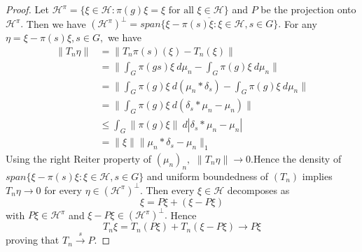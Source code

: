 \documentclass[11pt]{amsart}
\theoremstyle{definition}
\theoremstyle{myremark}
\numberwithin{equation}{section}
\begin{document}
 \begin{proof}
 Let $\mathcal{H}^\pi=\{\xi \in \mathcal{H}: \pi(g)\xi=\xi \text{ for all }\xi \in \mathcal{H}\}$ and $P$ be the projection onto $\mathcal{H}^\pi.$ Then we have $(\mathcal{H}^\pi)^{\perp}=\overline{span\{\xi-\pi(s)\xi: \xi \in \mathcal{H}, s\in G\}}.$
  For any $\eta=\xi-\pi(s)\xi, s\in G,$ we have 
  \begin{align*}
  \|T_n\eta\|
      &=\|T_n\pi(s)(\xi)-T_n(\xi)\|\\&= \|\int_G\pi(gs)\xi~d\mu_n-\int_G\pi(g)\xi~d\mu_n\|\\
      &=\|\int_G\pi(g)\xi~ d(\mu_n*\delta_s)-\int_G\pi(g)\xi~ d\mu_n\|\\
      &=\|\int_G\pi(g)\xi~ d(\delta_s*\mu_n-\mu_n)\|\\
      &\leq \int_G\|\pi(g)\xi\|~ d|\delta_s*\mu_n-\mu_n|\\
      &=\|\xi\|\|\mu_n*\delta_s-\mu_n\|_1
  \end{align*}
Using the right Reiter property of $(\mu_n)_n,$ $\|T_n\eta\| \to 0.$Hence the density of $span\{\xi-\pi(s)\xi: \xi \in \mathcal{H}, s\in G\} $ and uniform boundedness of $(T_n)$ implies $T_n\eta \to 0$ for every $\eta \in (\mathcal{H}^{\pi})^{\perp}.$
Then every $\xi \in \mathcal{H}$ decomposes as $$\xi=P\xi+(\xi-P\xi)$$
with $P\xi\in \mathcal{H}^\pi$ and $\xi-P\xi\in (\mathcal{H}^\pi)^{\perp}.$ Hence
$$T_n\xi=T_n(P\xi)+T_n(\xi-P\xi)
\longrightarrow
P\xi$$
proving that $T_n\xrightarrow{s}P.$
 \end{proof}
\end{document}
